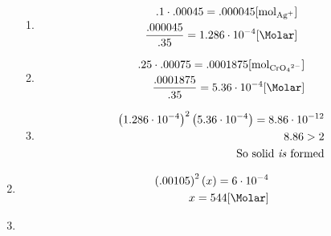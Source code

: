 \documentclass[12pt]{article}
\begin{document}
\begin{enumerate}
\begin{enumerate}
      \item 

        \begin{equation}
          \begin{split}
            .1\cdot.00045=.000045[\si{\mole}_{\ce{Ag+}}]\\
            \frac{.000045}{.35}=1.286\cdot10^{-4}[\si{\Molar}]\\
          \end{split}
          \label{7}
        \end{equation}

      \item 

        \begin{equation}
          \begin{split}
            .25\cdot.00075=.0001875[\si{\mole}_{\ce{CrO4^2-}}]\\
            \frac{.0001875}{.35}=5.36\cdot10^{-4}[\si{\Molar}]
          \end{split}
          \label{8}
        \end{equation}

      \item 

        \begin{equation}
          \begin{split}
            \left( 1.286\cdot10^{-4} \right)^2\left( 5.36\cdot10^{-4} \right)=8.86\cdot10^{-12}\\
            8.86>2\\
            \text{So solid \textit{is} formed}
          \end{split}
          \label{9}
        \end{equation}

    \end{enumerate}

  \item

        \begin{equation}
          \begin{split}
            \left( .00105 \right)^2(x)=6\cdot10^{-4}\\
            x=544[\si{\Molar}]
          \end{split}
          \label{10}
        \end{equation}

      \item {}


\end{enumerate}
\end{document}
